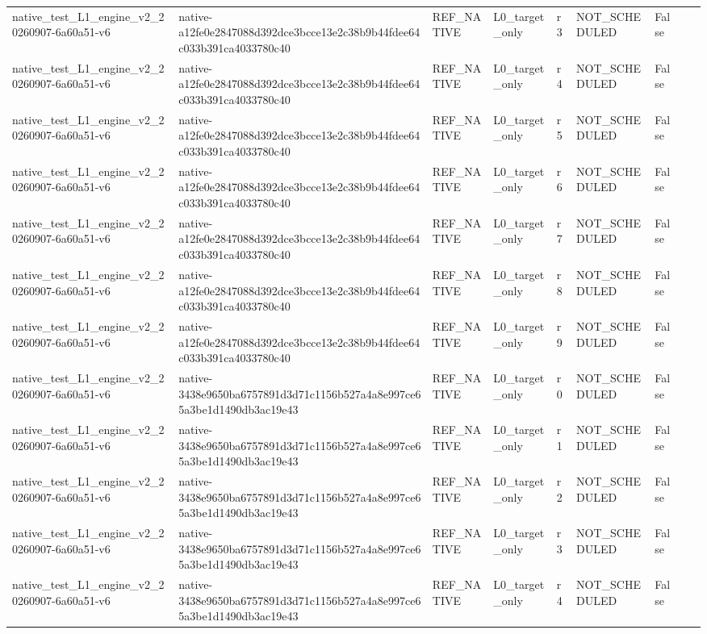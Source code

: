 \begin{tabular}{lllllllll}
native\_test\_L1\_engine\_v2\_20260907-6a60a51-v6 & native-a12fe0e2847088d392dce3bcce13e2c38b9b44fdee64c033b391ca4033780c40 & REF\_NATIVE & L0\_target\_only & r3 & NOT\_SCHEDULED & False &  &  \\
native\_test\_L1\_engine\_v2\_20260907-6a60a51-v6 & native-a12fe0e2847088d392dce3bcce13e2c38b9b44fdee64c033b391ca4033780c40 & REF\_NATIVE & L0\_target\_only & r4 & NOT\_SCHEDULED & False &  &  \\
native\_test\_L1\_engine\_v2\_20260907-6a60a51-v6 & native-a12fe0e2847088d392dce3bcce13e2c38b9b44fdee64c033b391ca4033780c40 & REF\_NATIVE & L0\_target\_only & r5 & NOT\_SCHEDULED & False &  &  \\
native\_test\_L1\_engine\_v2\_20260907-6a60a51-v6 & native-a12fe0e2847088d392dce3bcce13e2c38b9b44fdee64c033b391ca4033780c40 & REF\_NATIVE & L0\_target\_only & r6 & NOT\_SCHEDULED & False &  &  \\
native\_test\_L1\_engine\_v2\_20260907-6a60a51-v6 & native-a12fe0e2847088d392dce3bcce13e2c38b9b44fdee64c033b391ca4033780c40 & REF\_NATIVE & L0\_target\_only & r7 & NOT\_SCHEDULED & False &  &  \\
native\_test\_L1\_engine\_v2\_20260907-6a60a51-v6 & native-a12fe0e2847088d392dce3bcce13e2c38b9b44fdee64c033b391ca4033780c40 & REF\_NATIVE & L0\_target\_only & r8 & NOT\_SCHEDULED & False &  &  \\
native\_test\_L1\_engine\_v2\_20260907-6a60a51-v6 & native-a12fe0e2847088d392dce3bcce13e2c38b9b44fdee64c033b391ca4033780c40 & REF\_NATIVE & L0\_target\_only & r9 & NOT\_SCHEDULED & False &  &  \\
native\_test\_L1\_engine\_v2\_20260907-6a60a51-v6 & native-3438e9650ba6757891d3d71c1156b527a4a8e997ce65a3be1d1490db3ac19e43 & REF\_NATIVE & L0\_target\_only & r0 & NOT\_SCHEDULED & False &  &  \\
native\_test\_L1\_engine\_v2\_20260907-6a60a51-v6 & native-3438e9650ba6757891d3d71c1156b527a4a8e997ce65a3be1d1490db3ac19e43 & REF\_NATIVE & L0\_target\_only & r1 & NOT\_SCHEDULED & False &  &  \\
native\_test\_L1\_engine\_v2\_20260907-6a60a51-v6 & native-3438e9650ba6757891d3d71c1156b527a4a8e997ce65a3be1d1490db3ac19e43 & REF\_NATIVE & L0\_target\_only & r2 & NOT\_SCHEDULED & False &  &  \\
native\_test\_L1\_engine\_v2\_20260907-6a60a51-v6 & native-3438e9650ba6757891d3d71c1156b527a4a8e997ce65a3be1d1490db3ac19e43 & REF\_NATIVE & L0\_target\_only & r3 & NOT\_SCHEDULED & False &  &  \\
native\_test\_L1\_engine\_v2\_20260907-6a60a51-v6 & native-3438e9650ba6757891d3d71c1156b527a4a8e997ce65a3be1d1490db3ac19e43 & REF\_NATIVE & L0\_target\_only & r4 & NOT\_SCHEDULED & False &  &  \\

\end{tabular}
